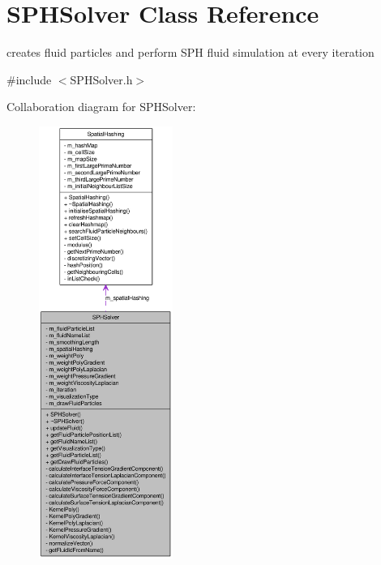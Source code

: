 \hypertarget{class_s_p_h_solver}{
\section{SPHSolver Class Reference}
\label{class_s_p_h_solver}
}


creates fluid particles and perform SPH fluid simulation at every iteration  




{\ttfamily \#include $<$SPHSolver.h$>$}



Collaboration diagram for SPHSolver:\nopagebreak
\begin{figure}[H]
\begin{center}
\leavevmode
\includegraphics[height=400pt]{class_s_p_h_solver__coll__graph}
\end{center}
\end{figure}
